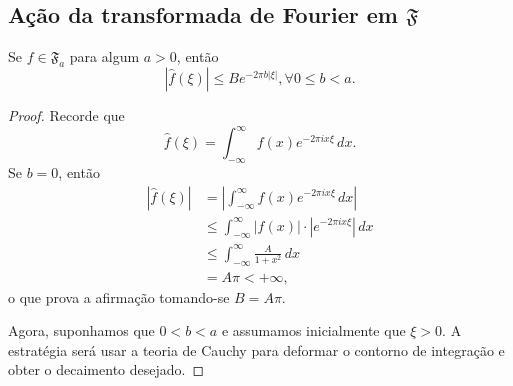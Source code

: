     \subsection{Ação da transformada de Fourier em \texorpdfstring{$\mathfrak{F}$}{F}}
        \begin{teorema}
        \label{teo-transf-fourier-decai-exp}
            Se $f\in\mathfrak{F}_a$ para algum $a>0$, então
            \begin{equation*}
                |\widehat{f}(\xi)| \leq Be^{-2\pi b|\xi|}, \forall 0\leq b < a.
            \end{equation*}
        \end{teorema}
        \begin{proof}
            Recorde que
            \begin{equation*}
            \widehat{f}(\xi) = \int_{-\infty}^{\infty} f(x) e^{-2\pi ix\xi} \, dx.
            \end{equation*}
            Se $b=0$, então
            \begin{align*}
                |\widehat{f}(\xi)| &= \left| \int_{-\infty}^{\infty} f(x) e^{-2\pi ix\xi} \, dx \right| \\
                                   &\leq \int_{-\infty}^{\infty} |f(x)|\cdot |e^{-2\pi ix\xi}| \, dx \\
                                   &\leq \int_{-\infty}^{\infty} \frac{A}{1+x^2} \, dx \\
                                   &= A\pi < +\infty,
            \end{align*}
            o que prova a afirmação tomando-se $B=A\pi$.
            
            Agora, suponhamos que $0 < b < a$ e assumamos inicialmente que $\xi > 0$.
            A estratégia será usar a teoria de Cauchy para deformar o contorno de integração e obter
            o decaimento desejado.
            

\end{proof}
